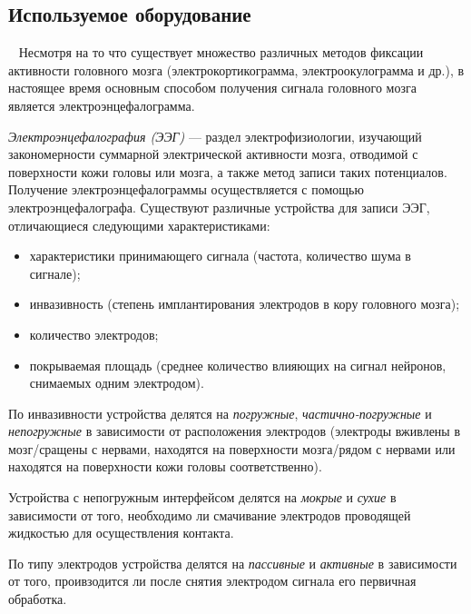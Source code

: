 \documentclass[12pt,fleqn]{article}
\begin{document}
	\subsection{Используемое оборудование}
	\quad\,\,\, Несмотря на то что существует множество различных методов фиксации активности головного мозга (электрокортикограмма, электроокулограмма и др.), в настоящее время основным способом получения сигнала головного мозга является электроэнцефалограмма. 
	\par {\it Электроэнцефалография (ЭЭГ)} — раздел электрофизиологии, изучающий закономерности суммарной электрической активности мозга, отводимой с поверхности кожи головы или мозга, а также метод записи таких потенциалов. Получение электроэнцефалограммы осуществляется с помощью электроэнцефалографа. Существуют различные устройства для записи ЭЭГ, отличающиеся следующими характеристиками: 
	\begin{itemize}\itemsep0pt
	\item
	характеристики принимающего сигнала (частота, количество шума в сигнале);
	\item
	инвазивность (степень имплантирования электродов в кору головного мозга);
	\item
	количество электродов;
	\item
	покрываемая площадь (среднее количество влияющих на сигнал нейронов, снимаемых одним электродом).
	\end{itemize}
	\par По инвазивности устройства делятся на {\it погружные}, {\it частично-погружные} и {\it непогружные} в зависимости от расположения электродов (электроды вживлены в мозг/сращены с нервами, находятся на поверхности мозга/рядом с нервами или находятся на поверхности кожи головы соответственно).

	\par Устройства с непогружным интерфейсом делятся на {\it мокрые} и {\it сухие} в зависимости от того, необходимо ли смачивание электродов проводящей жидкостью для осуществления контакта.
	\par По типу электродов устройства делятся на {\it пассивные} и {\it активные} в зависимости от того, проивзодится ли после снятия электродом сигнала его первичная обработка.
\end{document}
